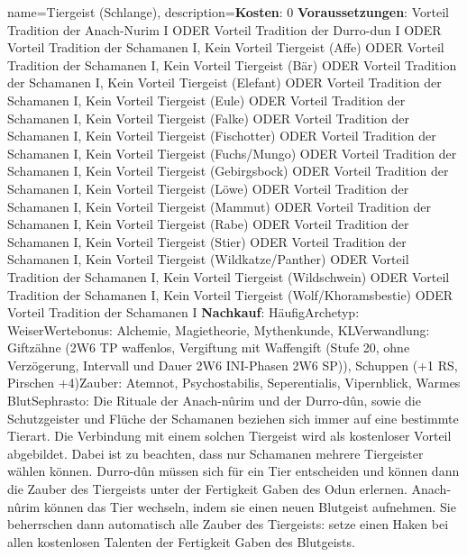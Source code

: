 {
    name={Tiergeist (Schlange)},
    description={\textbf{Kosten}: 0 \textbf{Voraussetzungen}: Vorteil Tradition der Anach-Nurim I ODER Vorteil Tradition der Durro-dun I ODER Vorteil Tradition der Schamanen I, Kein Vorteil Tiergeist (Affe) ODER Vorteil Tradition der Schamanen I, Kein Vorteil Tiergeist (Bär) ODER Vorteil Tradition der Schamanen I, Kein Vorteil Tiergeist (Elefant) ODER Vorteil Tradition der Schamanen I, Kein Vorteil Tiergeist (Eule) ODER Vorteil Tradition der Schamanen I, Kein Vorteil Tiergeist (Falke) ODER Vorteil Tradition der Schamanen I, Kein Vorteil Tiergeist (Fischotter) ODER Vorteil Tradition der Schamanen I, Kein Vorteil Tiergeist (Fuchs/Mungo) ODER Vorteil Tradition der Schamanen I, Kein Vorteil Tiergeist (Gebirgsbock) ODER Vorteil Tradition der Schamanen I, Kein Vorteil Tiergeist (Löwe) ODER Vorteil Tradition der Schamanen I, Kein Vorteil Tiergeist (Mammut) ODER Vorteil Tradition der Schamanen I, Kein Vorteil Tiergeist (Rabe) ODER Vorteil Tradition der Schamanen I, Kein Vorteil Tiergeist (Stier) ODER Vorteil Tradition der Schamanen I, Kein Vorteil Tiergeist (Wildkatze/Panther) ODER Vorteil Tradition der Schamanen I, Kein Vorteil Tiergeist (Wildschwein) ODER Vorteil Tradition der Schamanen I, Kein Vorteil Tiergeist (Wolf/Khoramsbestie) ODER Vorteil Tradition der Schamanen I \textbf{Nachkauf}: Häufig\newline Archetyp: Weiser\newline Wertebonus: Alchemie, Magietheorie, Mythenkunde, KL\newline Verwandlung: Giftzähne (2W6 TP waffenlos, Vergiftung mit Waffengift (Stufe 20, ohne Verzögerung, Intervall und Dauer 2W6 INI-Phasen 2W6 SP)), Schuppen (+1 RS, Pirschen +4)\newline Zauber: Atemnot, Psychostabilis, Seperentialis, Vipernblick, Warmes Blut\newline Sephrasto: Die Rituale der Anach-nûrim und der Durro-dûn, sowie die Schutzgeister und Flüche der Schamanen beziehen sich immer auf eine bestimmte Tierart. Die Verbindung mit einem solchen Tiergeist wird als kostenloser Vorteil abgebildet. Dabei ist zu beachten, dass nur Schamanen mehrere Tiergeister wählen können. Durro-dûn müssen sich für ein Tier entscheiden und können dann die Zauber des Tiergeists unter der Fertigkeit Gaben des Odun erlernen. Anach-nûrim können das Tier wechseln, indem sie einen neuen Blutgeist aufnehmen. Sie beherrschen dann automatisch alle Zauber des Tiergeists: setze einen Haken bei allen kostenlosen Talenten der Fertigkeit Gaben des Blutgeists.}
}


